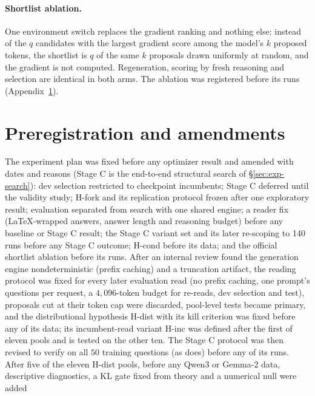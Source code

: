 \paragraph{Shortlist ablation.} One environment switch replaces the gradient ranking and nothing
else: instead of the $q$ candidates with the largest gradient score among the model's $k$ proposed
tokens, the shortlist is $q$ of the same $k$ proposals drawn uniformly at random, and the gradient
is not computed. Regeneration, scoring by fresh reasoning and selection are identical in both
arms. The ablation was registered before its runs (Appendix~\ref{app:prereg}).

\section{Preregistration and amendments}
\label{app:prereg}
The experiment plan was fixed before any optimizer result and amended with dates and
reasons (Stage C is the end-to-end structural search of \S\ref{sec:exp-search}): dev selection
restricted to checkpoint incumbents; Stage C deferred until the
validity study; H-fork and its replication protocol frozen after one exploratory result;
evaluation separated from search with one shared engine; a reader fix (\LaTeX{}-wrapped
answers, answer length and reasoning budget) before any baseline or Stage C result; the
Stage C variant set and its later re-scoping to 140 runs before any Stage C outcome;
H-cond before its data; and the official \greater{} shortlist ablation before its runs.
After an internal review found the generation engine nondeterministic (prefix caching) and a
truncation artifact, the reading protocol was fixed for every later evaluation read (no prefix caching, one
prompt's questions per request, a $4{,}096$-token budget for re-reads, dev selection and test),
proposals cut at their token cap were discarded, pool-level tests became primary, and the
distributional hypothesis H-dist with its kill criterion was fixed before any of its data; its
incumbent-read variant H-inc was defined after the first of eleven pools and is tested on the other
ten. The Stage C protocol was then revised to verify on all $50$ training questions (as \greater{}
does) before any of its runs. After five of the eleven H-dist pools, before any Qwen3 or Gemma-2
data, descriptive diagnostics, a KL gate fixed from theory and a numerical null were added
